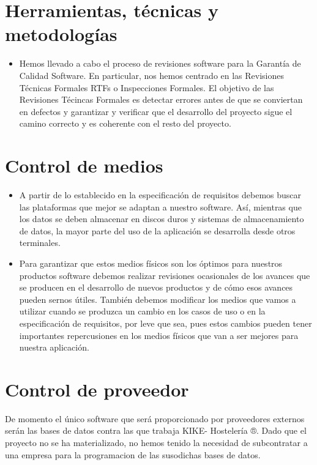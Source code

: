 \documentclass[spanish,a4paper,11pt, twoside]{report}	%
\begin{document}
\newpage
\mbox{}
\thispagestyle{empty}						%
\newpage

\chapter{ Herramientas, técnicas y metodologías}
	\begin{itemize}
	\item Hemos llevado a cabo el proceso de revisiones software para la Garantía de Calidad Software. En particular, nos hemos centrado en las Revisiones Técnicas Formales RTFs o Inspecciones Formales. El objetivo de las Revisiones Técincas Formales es detectar errores antes de que se conviertan en defectos y garantizar y verificar que el desarrollo del proyecto sigue el camino correcto y es coherente con el resto del proyecto.
	\end{itemize}

\newpage
\mbox{}
\thispagestyle{empty}						%
\newpage

\chapter{ Control de medios}
	\begin{itemize}
		\item A partir de lo establecido en la especificación de requisitos debemos buscar las plataformas que mejor se adaptan a nuestro software. Así, mientras que los datos se deben almacenar en discos duros y sistemas de almacenamiento de datos, la mayor parte del uso de la aplicación se desarrolla desde otros terminales.
		\item Para garantizar que estos medios físicos son los óptimos para nuestros productos software debemos realizar revisiones ocasionales de los avances que se producen en el desarrollo de nuevos productos y de cómo esos avances pueden sernos útiles. También debemos modificar los medios que vamos a utilizar cuando se produzca un cambio en los casos de uso o en la especificación de requisitos, por leve que sea, pues estos cambios pueden tener importantes repercusiones en los medios físicos que van a ser mejores para nuestra aplicación.
	\end{itemize}

\newpage
\mbox{}
\thispagestyle{empty}						%
\newpage

\chapter{ Control de proveedor}
De momento el único software que será proporcionado por proveedores externos serán las bases de datos contra las que trabaja KIKE- Hostelería ®. Dado que el proyecto no se ha materializado, no hemos tenido la necesidad de subcontratar a una empresa para la programacion de las susodichas bases de datos.
 
\end{document}
